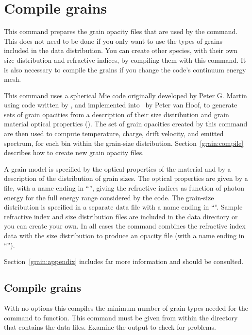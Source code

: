 \section{Compile grains}
\label{sec:CompileGrains}

This command prepares the grain opacity files that are used by the
 command.
This does not need to be done if you only want to use
the types of grains included in the data distribution.
You can create other species, with their own size
distribution and refractive indices, by compiling them with this command.
It is also necessary to compile the grains if you change the code's
continuum energy mesh.

This command uses a spherical Mie code originally developed by Peter
G. Martin using code written by \citet{Hansen1974}, and implemented
into \Cloudy\ by Peter van Hoof, to generate sets of grain opacities from
a description of their size distribution and grain material optical
properties (\citealp{VanHoof2004}).
The set of grain opacities created by
this  command are then used to
compute temperature, charge, drift
velocity, and emitted spectrum, for each bin within the
grain-size distribution.
Section~\ref{grain:compile} describes how to create new grain opacity files.

A grain model is specified by the optical properties of the material
and by a description of the distribution of grain sizes.
The optical
properties are given by a file, with a name ending in ``'',
giving the
refractive indices as function of photon energy for the full energy range
considered by the code.
The grain-size distribution is specified in a
separate data file with a name ending in ``''.
Sample refractive index
and size distribution files are included in the data directory or you can
create your own.
In all cases the  command combines the refractive
index data with the size distribution to produce an opacity file
(with a name ending in ``'').

Section~\ref{grain:appendix} includes far
more information and should be consulted.

\subsection{Compile grains}

With no options this compiles the minimum number of grain types needed
for the  command to function.
This command must be given from within
the directory that contains the data files.
Examine the output to check
for problems.

